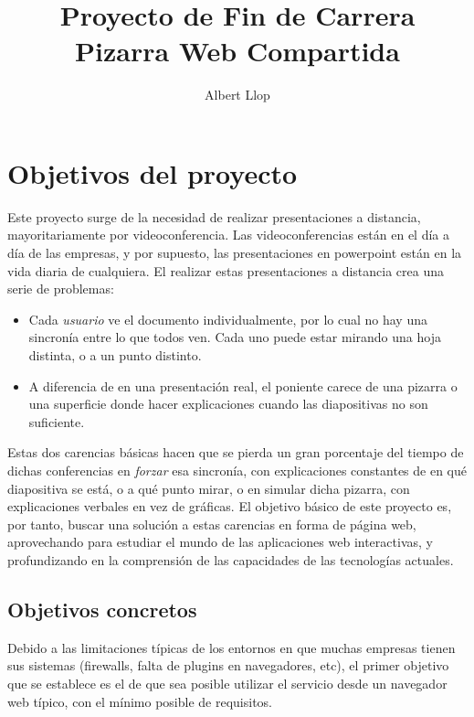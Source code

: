 \documentclass [11pt]{article}
\begin{document}
\author{Albert Llop}
\title{\Huge{\textbf{Proyecto de Fin de Carrera} \\ Pizarra Web Compartida}}
\maketitle
\section{Objetivos del proyecto}
Este proyecto surge de la necesidad de realizar presentaciones a distancia, mayoritariamente por videoconferencia. Las videoconferencias están en el día a día de las empresas, y por supuesto, las presentaciones en powerpoint están en la vida diaria de cualquiera. El realizar estas presentaciones a distancia crea una serie de problemas:

\begin{itemize}
	\item Cada \emph{usuario} ve el documento individualmente, por lo cual no hay una sincronía entre lo que todos ven. Cada uno puede estar mirando una hoja distinta, o a un punto distinto.
	\item A diferencia de en una presentación real, el poniente carece de una pizarra o una superficie donde hacer explicaciones cuando las diapositivas no son suficiente.
\end{itemize}

Estas dos carencias básicas hacen que se pierda un gran porcentaje del tiempo de dichas conferencias en \emph{forzar} esa sincronía, con explicaciones constantes de en qué diapositiva se está, o a qué punto mirar, o en simular dicha pizarra, con explicaciones verbales en vez de gráficas. El objetivo básico de este proyecto es, por tanto, buscar una solución a estas carencias en forma de página web, aprovechando para estudiar el mundo de las aplicaciones web interactivas, y profundizando en la comprensión de las capacidades de las tecnologías actuales.

\subsection{Objetivos concretos}

Debido a las limitaciones típicas de los entornos en que muchas empresas tienen sus sistemas (firewalls, falta de plugins en navegadores, etc), el primer objetivo que se establece es el de que sea posible utilizar el servicio desde un navegador web típico, con el mínimo posible de requisitos.
\end{document}
